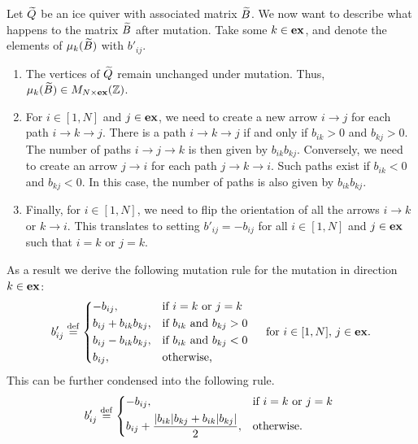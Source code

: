 Let $\widetilde{Q}$ be an ice quiver with associated matrix $\widetilde{B}$. We now want to describe what
happens to the matrix $\widetilde{B}$ after mutation. Take some $k \in \mathbf{ex}$, and denote the
elements of $\mu_k(\widetilde{B})$ with $b'_{ij}$.
\begin{enumerate}
	\item The vertices of $\widetilde{Q}$ remain unchanged under mutation. Thus, $\mu_k(\widetilde{B}) \in M_{N
				      \times \mathbf{ex}}(\mathbb{Z})$.
	\item For $i \in [1, N]$ and $j \in \mathbf{ex}$, we need to create a new arrow $i \to j$ for each
	      path $i \to k \to j$. There is a path $i \to k \to j$ if and only if $b_{ik} >0$ and
	      $b_{kj} > 0$. The number of paths $i\to j\to k$ is then given by $b_{ik}b_{kj}$.
	      Conversely, we need to create an arrow $j \to i$ for each path $j \to k \to i$. Such
	      paths exist if $b_{ik} <0$ and $b_{kj} < 0$. In this case, the number of paths is also
	      given by $b_{ik}b_{kj}$.
	\item Finally, for $i \in [1,N]$, we need to flip the orientation of all the arrows $i \to k$
	      or $k \to i$. This translates to setting $b'_{ij} = -b_{ij}$ for all $i \in [1, N]$ and
	      $j \in \mathbf{ex}$ such that $i = k$ or $j = k$.
\end{enumerate}
As a result we derive the following mutation rule for the mutation in direction $k\in \mathbf{ex}$:
\begin{equation}\label{eq:mutation_rule_matrix_expanded}
	b'_{ij} \defeq \begin{dcases*}
		-b_{ij},               & if $i = k$ or $j = k$        \\
		b_{ij} + b_{ik}b_{kj}, & if $b_{ik}$ and $b_{kj} > 0$ \\
		b_{ij} - b_{ik}b_{kj}, & if $b_{ik}$ and $b_{kj} < 0$ \\
		b_{ij},                & otherwise,
	\end{dcases*}
	\quad \text{for } i \in [1, N],\,j \in \ex.
\end{equation}
%
This can be further condensed into the following rule.
\begin{equation}\label{eq:mutation_rule_matrix_condensed}
	b'_{ij} \defeq \begin{dcases*}
		-b_{ij},                                            & if $i = k$ or $j = k$ \\
		b_{ij} + \frac{|b_{ik}|b_{kj} + b_{ik}|b_{kj}|}{2}, & otherwise.
	\end{dcases*}
\end{equation}

